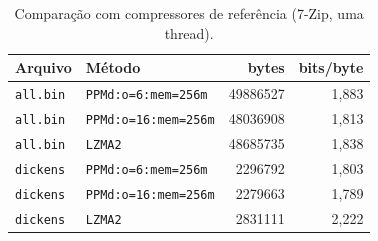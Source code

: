 \begin{table}[H]
\centering
\caption{Comparação com compressores de referência (7-Zip, uma thread).}
\label{tab:comercial}
\begin{tabular}{llrr}
\toprule
Arquivo & Método & bytes & bits/byte \\
\midrule
\texttt{all.bin} & \texttt{PPMd:o=6:mem=256m} & 49886527 & 1,883 \\
\texttt{all.bin} & \texttt{PPMd:o=16:mem=256m} & 48036908 & 1,813 \\
\texttt{all.bin} & \texttt{LZMA2} & 48685735 & 1,838 \\
\texttt{dickens} & \texttt{PPMd:o=6:mem=256m} & 2296792 & 1,803 \\
\texttt{dickens} & \texttt{PPMd:o=16:mem=256m} & 2279663 & 1,789 \\
\texttt{dickens} & \texttt{LZMA2} & 2831111 & 2,222 \\
\bottomrule
\end{tabular}
\end{table}
